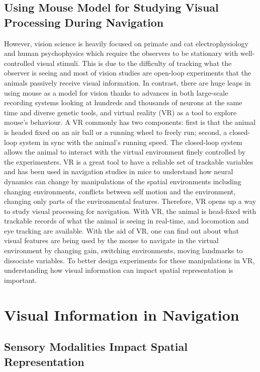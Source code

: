 \subsection{Using Mouse Model for Studying Visual Processing During Navigation}
However, vision science is heavily focused on primate and cat electrophysiology and human psychophysics which require the observers to be stationary with well-controlled visual stimuli. This is due to the difficulty of tracking what the observer is seeing and most of vision studies are open-loop experiments that the animals passively receive visual information. In contrast, there are huge leaps in using mouse as a model for vision thanks to advances in both large-scale recording systems looking at hundreds and thousands of neurons at the same time and diverse genetic tools, and virtual reality (VR) as a tool to explore mouse's behaviour. A VR commonly has two components: first is that the animal is headed fixed on an air ball or a running wheel to freely run; second, a closed-loop system in sync with the animal's running speed. The closed-loop system allows the animal to interact with the virtual environment finely controlled by the experimenters. VR is a great tool to have a reliable set of trackable variables and has been used in navigation studies in mice to understand how neural dynamics can change by manipulations of the spatial environments including changing environments, conflicts between self motion and the environment, changing only parts of the environmental features. Therefore, VR opens up a way to study visual processing for navigation. With VR, the animal is head-fixed with trackable records of what the animal is seeing in real-time, and locomotion and eye tracking are available. With the aid of VR, one can find out about what visual features are being used by the mouse to navigate in the virtual environment by changing gain, switching environments, moving landmarks to dissociate variables. To better design experiments for these manipulations in VR, understanding how visual information can impact spatial representation is important.


\section{Visual Information in Navigation}
\subsection{Sensory Modalities Impact Spatial Representation}

